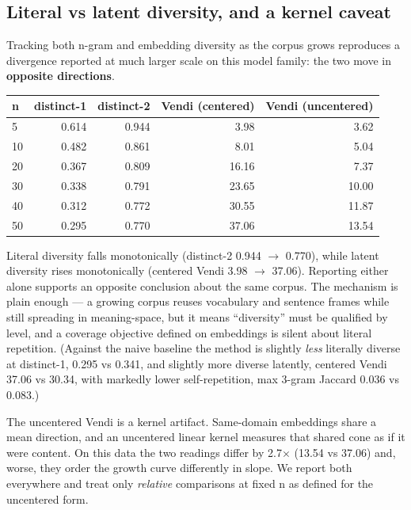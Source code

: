 \documentclass[11pt]{article}
\theoremstyle{plain}
\theoremstyle{definition}
\begin{document}
\subsection{Literal vs latent diversity, and a kernel caveat}
Tracking both n-gram and embedding diversity as the corpus grows reproduces a divergence reported at much larger scale on this model family: the two move in \textbf{opposite directions}.

\begin{table}[htbp]
\centering
\small
\begin{tabular}{lrrrr}
\toprule
\textbf{n} & \textbf{distinct-1} & \textbf{distinct-2} & \textbf{Vendi (centered)} & \textbf{Vendi (uncentered)} \\
\midrule
5 & 0.614 & 0.944 & 3.98 & 3.62 \\
10 & 0.482 & 0.861 & 8.01 & 5.04 \\
20 & 0.367 & 0.809 & 16.16 & 7.37 \\
30 & 0.338 & 0.791 & 23.65 & 10.00 \\
40 & 0.312 & 0.772 & 30.55 & 11.87 \\
50 & 0.295 & 0.770 & 37.06 & 13.54 \\
\bottomrule
\end{tabular}
\end{table}

Literal diversity falls monotonically (distinct-2 0.944 $\to$ 0.770), while latent diversity rises monotonically (centered Vendi 3.98 $\to$ 37.06). Reporting either alone supports an opposite conclusion about the same corpus. The mechanism is plain enough --- a growing corpus reuses vocabulary and sentence frames while still spreading in meaning-space, but it means ``diversity'' must be qualified by level, and a coverage objective defined on embeddings is silent about literal repetition. (Against the naive baseline the method is slightly \emph{less} literally diverse at distinct-1, 0.295 vs 0.341, and slightly more diverse latently, centered Vendi 37.06 vs 30.34, with markedly lower self-repetition, max 3-gram Jaccard 0.036 vs 0.083.)

The uncentered Vendi is a kernel artifact. Same-domain embeddings share a mean direction, and an uncentered linear kernel measures that shared cone as if it were content. On this data the two readings differ by 2.7$\times$ (13.54 vs 37.06) and, worse, they order the growth curve differently in slope. We report both everywhere and treat only \emph{relative} comparisons at fixed n as defined for the uncentered form.
\end{document}
